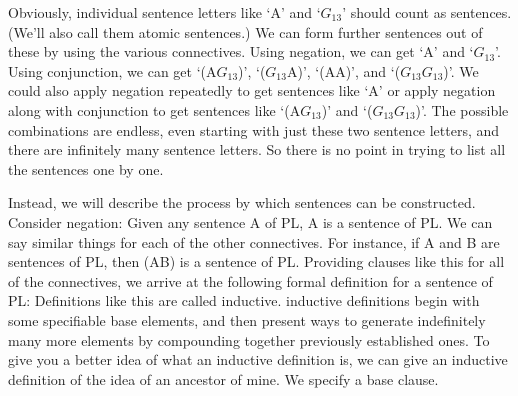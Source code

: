 Obviously, individual sentence letters like ‘A’ and ‘$G_{13}$’ should count as sentences. (We’ll also call them atomic sentences.) We can form further sentences out of these by using the various connectives. Using negation, we can get ‘\enot A’ and ‘\enot $G_{13}$’. Using conjunction, we can get ‘(A\eand $G_{13}$)’, ‘($G_{13}$\eand A)’, ‘(A\eand A)’, and ‘($G_{13}$\eand $G_{13}$)’. We could also apply negation repeatedly to get sentences like ‘\enot\enot A’ or apply negation along with conjunction to get sentences like ‘\enot(A\eand $G_{13}$)’ and ‘\enot($G_{13}$\eand \enot $G_{13}$)’. The possible combinations are endless, even starting with just these two sentence letters, and there are infinitely many sentence letters. So there is no point in trying to list all the sentences one by one.

Instead, we will describe the process by which sentences can be constructed. Consider negation: Given any sentence A of PL, \enot A is a sentence of PL. We can say similar things for each of the other connectives. For instance, if A and B are sentences of PL, then (A\eand B) is a \gls{sentence of PL}. Providing clauses like this for all of the connectives, we arrive at the following formal definition for a sentence of PL:
Definitions like this are called inductive. inductive definitions begin with some specifiable base elements, and then present ways to generate indefinitely many more elements by compounding together previously established ones. To give you a better idea of what an inductive definition is, we can give an inductive definition of the idea of an ancestor of mine. We specify a base clause.
